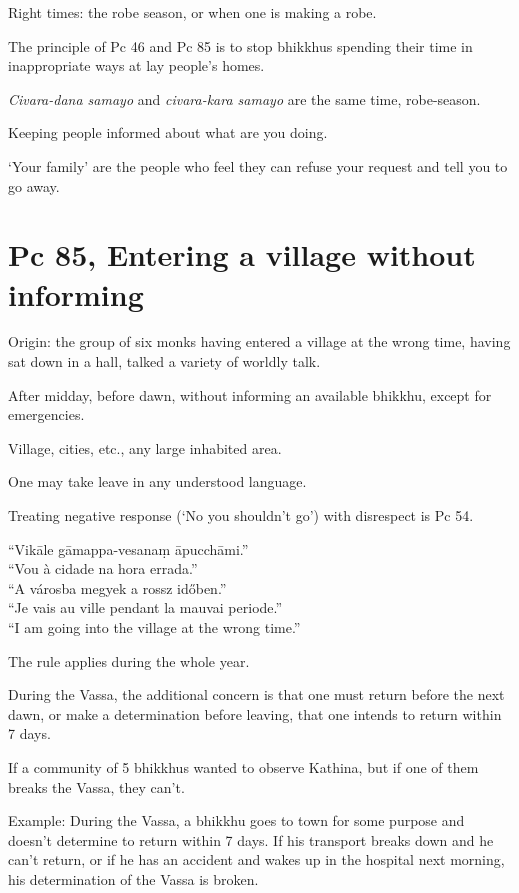 Right times: the robe season, or when one is making a robe.

The principle of Pc 46 and Pc 85 is to stop bhikkhus spending their time
in inappropriate ways at lay people's homes.

\emph{Civara-dana samayo} and \emph{civara-kara samayo} are the same
time, robe-season.

Keeping people informed about what are you doing.

`Your family' are the people who feel they can refuse your request and
tell you to go away.

\section{Pc 85, Entering a village without informing}

\begin{multicols}{2}

Origin: the group of six monks having entered a village at the wrong
time, having sat down in a hall, talked a variety of worldly talk.

After midday, before dawn, without informing an available bhikkhu,
except for emergencies.

Village, cities, etc., any large inhabited area.

One may take leave in any understood language.

Treating negative response (`No you shouldn't go') with disrespect is Pc
54.

``Vikāle gāmappa-vesanaṃ āpucchāmi.''\\
``Vou à cidade na hora errada.''\\
``A városba megyek a rossz időben.''\\
``Je vais au ville pendant la mauvai periode.''\\
``I am going into the village at the wrong time.''

The rule applies during the whole year.

During the Vassa, the additional concern is that one must return before
the next dawn, or make a determination before leaving, that one intends
to return within 7 days.

If a community of 5 bhikkhus wanted to observe Kathina, but if one of
them breaks the Vassa, they can't.

Example: During the Vassa, a bhikkhu goes to town for some purpose and
doesn't determine to return within 7 days. If his transport breaks down
and he can't return, or if he has an accident and wakes up in the
hospital next morning, his determination of the Vassa is broken.

\end{multicols}

